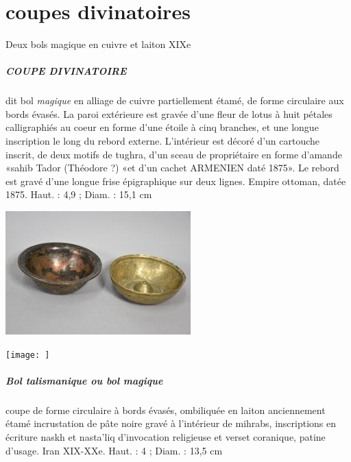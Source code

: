 \chapter{coupes divinatoires}

Deux bols magique en cuivre et laiton XIXe
\paragraph{COUPE DIVINATOIRE} dit bol \textit{magique} en alliage de cuivre partiellement étamé, de forme circulaire aux bords évasés. La paroi extérieure est gravée d'une fleur de lotus à huit pétales calligraphiés au coeur en forme d'une étoile à cinq branches, et une longue inscription le long du rebord externe. L'intérieur est décoré d'un cartouche inscrit, de deux motifs de tughra, d'un sceau de propriétaire en forme d'amande «sahib Tador (Théodore ?) «et d'un cachet ARMENIEN daté 1875». Le rebord est gravé d'une longue frise épigraphique sur deux lignes. Empire ottoman, datée 1875.
Haut. : 4,9 ; Diam. : 15,1 cm

\includegraphics[]{GénéralISTR/Image/bolsmagiques.jpeg}

\texttt{[image: ]}


\paragraph{Bol talismanique ou bol magique} coupe de forme circulaire à bords évasés, ombiliquée en laiton anciennement étamé incrustation de pâte noire gravé à l'intérieur de mihrabs, inscriptions en écriture naskh et nasta'liq d'invocation religieuse et verset coranique, patine d'usage. Iran XIX-XXe.
Haut. : 4 ; Diam. : 13,5 cm
